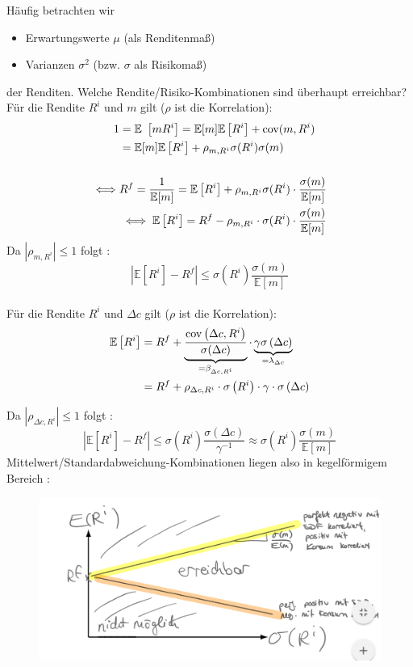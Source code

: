 \documentclass[12pt]{extreport} %
\theoremstyle{named}
\theoremstyle{nnamed}
\theoremstyle{itshape}
\theoremstyle{normal}
\begin{document}
Häufig betrachten wir
\begin{itemize}
	\item Erwartungswerte $\mu$ (als Renditenmaß)
	\item Varianzen $\sigma^2$ (bzw. $\sigma$ als Risikomaß)
\end{itemize}
der Renditen. Welche Rendite/Risiko-Kombinationen sind überhaupt erreichbar? Für die Rendite $R^i$ und $m$ gilt ($\rho$ ist die Korrelation):
	\begin{align*}
		1 & = \mathbb{E} \left[ m R^i \right] = \mathbb{E}[m] \mathbb{E} \left[ R^i \right] + \cov(m, R^i) \\
		  & = \mathbb{E}[m] \mathbb{E} \left[ R^i \right] + \rho_{m, R^i} \sigma(R^i) \sigma(m) \\ ~\\
	 \iff & R^f = \frac{1}{\mathbb{E}[m]} = \mathbb{E} \left[ R^i \right] + \rho_{m, R^i} \sigma( R^i) \cdot \frac{\sigma(m)}{\mathbb{E}[m]} \\
	 & \iff \mathbb{E} \left[ R^i \right] =  R^f  - \rho_{m, R^i} \cdot \sigma( R^i) \cdot \frac{\sigma(m)}{\mathbb{E}[m]}
	\end{align*}
Da $\left| \rho_{m, R^i} \right| \leq 1$ folgt : %
	$$ \left| \mathbb{E} \left[ R^i \right] - R^f \right| \leq \sigma (R^i) \frac{\sigma(m)}{\mathbb{E}[m]} $$ ~\\

Für die Rendite $R^i$ und $\Delta c$ gilt ($\rho$ ist die Korrelation):
\begin{align*}
	\mathbb{E} \left[ R^i \right] & = R^f + \underbrace{\frac{\operatorname{cov} \left(\Delta c, R^i \right)}{\sigma(\Delta c)}}_{= \beta_{\Delta c, R^i}} \cdot \underbrace{\gamma \sigma \left( \Delta c \right)}_{=\lambda_{\Delta c}} \\
	& = R^f + \rho_{\Delta c, R^i} \cdot \sigma  \left( R^i \right) \cdot \gamma  \cdot\sigma \left( \Delta c \right)
\end{align*}

Da $\left| \rho_{\Delta c, R^i} \right| \leq 1$ folgt :
	$$ \left| \mathbb{E} \left[ R^i \right] - R^f \right| \leq \sigma (R^i) \frac{\sigma(\Delta c)}{\gamma^{-1}} \approx \sigma( R^i ) \frac{\sigma(m)}{\mathbb{E}[m]} $$	
Mittelwert/Standardabweichung-Kombinationen liegen also in kegelförmigem Bereich	:
~
\begin{figure}[h!] \centering
	\includegraphics[scale=0.5]{img/p49}
\end{figure}	
	
\end{document}
